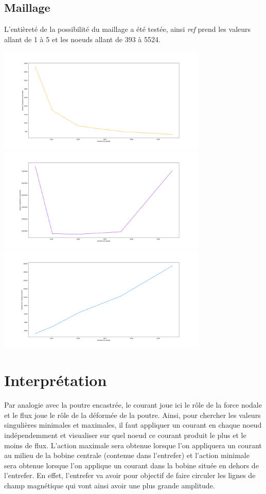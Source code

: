 \documentclass{article}[11pt]
\newcommand{\python}[1]{\textcolor{pythonColor}{\textit{#1}}}
\begin{document}
\subsection{Maillage}
L'entièreté de la possibilité du maillage a été testée, ainsi \python{ref} prend les valeurs allant de 1 à 5 et les noeuds allant de 393 à 5524.
\begin{center}
    \includegraphics[width = 10cm]{influences/plots/ref_min.png}
    \includegraphics[width = 10cm]{influences/plots/ref_max.png}
    \includegraphics[width = 10cm]{influences/plots/ref_k.png}
\end{center}

\section{Interprétation}

Par analogie avec la poutre encastrée, le courant joue ici le rôle de la force nodale et le flux joue le rôle de la déformée de la poutre. Ainsi, pour chercher les valeurs singulières minimales et maximales, il faut appliquer un courant en chaque noeud indépendemment et visualiser sur quel noeud ce courant produit le plus et le moins de flux. L'action maximale sera obtenue lorsque l'on appliquera un courant au milieu de la bobine centrale (contenue dans l'entrefer) et l'action minimale sera obtenue lorsque l'on applique un courant dans la bobine située en dehors de l'entrefer. En effet, l'entrefer va avoir pour objectif de faire circuler les lignes de champ magnétique qui vont ainsi avoir une plus grande amplitude.
\end{document}
